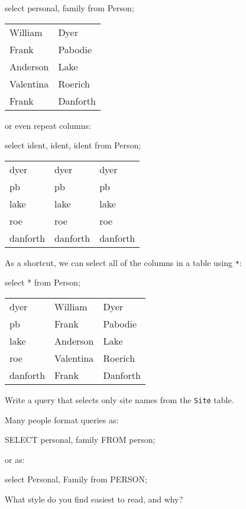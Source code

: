 \documentclass{book}
\begin{document}
\begin{VerbIn}
select personal, family from Person;
\end{VerbIn}

\begin{tabular}{ll}
William & Dyer \\
Frank & Pabodie \\
Anderson & Lake \\
Valentina & Roerich \\
Frank & Danforth \\
\end{tabular}

or even repeat columns:

\begin{VerbIn}
select ident, ident, ident from Person;
\end{VerbIn}

\begin{tabular}{lll}
dyer & dyer & dyer \\
pb & pb & pb \\
lake & lake & lake \\
roe & roe & roe \\
danforth & danforth & danforth \\
\end{tabular}

As a shortcut, we can select all of the columns in a table using
\texttt{*}:

\begin{VerbIn}
select * from Person;
\end{VerbIn}

\begin{tabular}{lll}
dyer & William & Dyer \\
pb & Frank & Pabodie \\
lake & Anderson & Lake \\
roe & Valentina & Roerich \\
danforth & Frank & Danforth \\
\end{tabular}

\begin{challenge}
  Write a query that selects only site names from the \texttt{Site}
  table.
\end{challenge}

\begin{challenge}
  Many people format queries as:

\begin{VerbIn}
SELECT personal, family FROM person;
\end{VerbIn}

  or as:

\begin{VerbIn}
select Personal, Family from PERSON;
\end{VerbIn}

  What style do you find easiest to read, and why?
\end{challenge}
\end{document}
